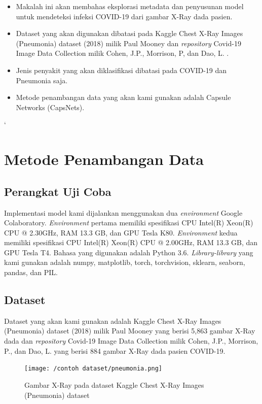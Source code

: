 \documentclass{article}
\begin{document}
	   \begin{itemize}
	   	\item Makalah ini akan membahas eksplorasi metadata dan penyusunan model untuk mendeteksi infeksi COVID-19 dari gambar X-Ray dada pasien\cite{cohen}.
	   	\item Dataset yang akan digunakan dibatasi pada Kaggle Chest X-Ray Images (Pneumonia) dataset (2018) milik Paul Mooney \cite{mooney} dan \textit{repository} Covid-19 Image Data Collection milik Cohen, J.P., Morrison, P, dan Dao, L. \cite{cohen}.
	   	\item Jenis penyakit yang akan diklasifikasi dibatasi pada COVID-19 dan Pneumonia saja.
	   	\item Metode penambangan data yang akan kami gunakan adalah Capsule Networks (CapsNets).
	   \end{itemize}
`  \newpage
   \section{Metode Penambangan Data}
    \subsection{Perangkat Uji Coba}
    Implementasi model kami dijalankan menggunakan dua \textit{environment} Google Colaboratory. \textit{Environment} pertama memiliki spesifikasi CPU Intel(R) Xeon(R) CPU @ 2.30GHz, RAM 13.3 GB, dan GPU Tesla K80. \textit{Environment} kedua memiliki spesifikasi CPU Intel(R) Xeon(R) CPU @ 2.00GHz, RAM 13.3 GB, dan GPU Tesla T4. Bahasa yang digunakan adalah Python 3.6. \textit{Library-library} yang kami gunakan adalah numpy, matplotlib, torch, torchvision, sklearn, seaborn, pandas, dan PIL. 
    
    \subsection{Dataset}
    Dataset yang akan kami gunakan adalah Kaggle Chest X-Ray Images (Pneumonia) dataset (2018) milik Paul Mooney \cite{mooney} yang berisi 5,863 gambar X-Ray dada dan \textit{repository} Covid-19 Image Data Collection milik Cohen, J.P., Morrison, P., dan Dao, L. \cite{cohen} yang berisi 884 gambar X-Ray dada pasien COVID-19.
    
    \begin{figure}[H]
    	\centering
    	\texttt{[image: /contoh dataset/pneumonia.png]}
    	\caption{Gambar X-Ray pada dataset Kaggle Chest X-Ray Images (Pneumonia) dataset}
    \end{figure} 
\end{document}
